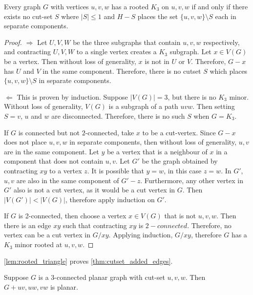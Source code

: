 \begin{lemma}\label{lem:rooted_triangle}
	Every graph $G$ with vertices $u, v, w$ has a rooted $K_3$ on $u, v, w$ if and only if there exists no cut-set $S$ where $|S| \leq 1$ and $H - S$ places the set $\{u,v,w\} \setminus S$ each in separate components. 
\end{lemma}
\begin{proof}
	$\Rightarrow$ Let $U,V,W$ be the three subgraphs that contain $u, v, w$ respectively, and contracting $U, V, W$ to a single vertex creates a $K_3$ subgraph. Let $x \in V(G)$ be a vertex. Then without loss of generality, $x$ is not in $U$ or $V$. Therefore, $G - x$ has $U$ and $V$ in the same component. Therefore, there is no cutset $S$ which places $\{u,v,w\} \setminus S$ in separate components. 

	$\Leftarrow$ This is proven by induction. Suppose $|V(G)| = 3$, but there is no $K_3$ minor. Without loss of generality, $V(G)$ is a subgraph of a path $uvw$. Then setting $S = v$, $u$ and $w$ are disconnected. Therefore, there is no such $S$ when $G = K_3$. 

	If $G$ is connected but not $2$-connected, take $x$ to be a cut-vertex. Since $G - x$ does not place $u,v,w$ in separate components, then without loss of generality, $u,v$ are in the same component. Let $y$ be a vertex that is a neighbour of $x$ in a component that does not contain $u,v$. Let $G'$ be the graph obtained by contracting $xy$ to a vertex $z$. It is possible that $y = w$, in this case $z = w$. In $G'$, $u,v$ are also in the same component of $G' - z$. Furthermore, any other vertex in $G'$ also is not a cut vertex, as it would be a cut vertex in $G$. Then $|V(G')| < |V(G)|$, therefore apply induction on $G'$. 

	If $G$ is 2-connected, then choose a vertex $x \in V(G)$ that is not $u,v,w$. Then there is an edge $xy$ such that contracting $xy$ is $2-connected$. Therefore, no vertex can be a cut vertex in $G/xy$. Applying induction, $G/xy$, therefore $G$ has a $K_3$ minor rooted at $u,v,w$.
\end{proof}


\cref{lem:rooted_triangle} proves \cref{thm:cutset_added_edges}. 

\begin{lemma}\label{thm:cutset_added_edges}
	Suppose $G$ is a $3$-connected planar graph with cut-set $u,v,w$. Then $G + uv, uw, vw$ is planar. 
\end{lemma}

